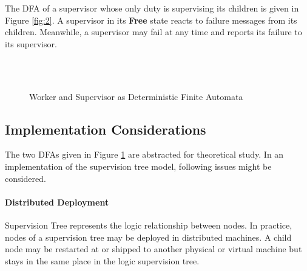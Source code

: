 \documentclass[12pt, authoryear]{article}
\begin{document}
The DFA of a supervisor whose only duty is supervising its children is given in
Figure \ref{fig:2}.  A supervisor in its {\bf Free} state reacts to failure 
messages from its children.  Meanwhile, a supervisor may fail at any time 
and reports its failure to its supervisor.

\begin{figure}[p]
     \centering 
        \\
        \\
  \caption{Worker and Supervisor as Deterministic Finite Automata}
  \label{fig:DFA}        
\end{figure}

\subsection{Implementation Considerations}

The two DFAs given in Figure \ref{fig:DFA} are abstracted for theoretical 
study.  In an implementation of the supervision tree model, following issues 
might be considered.

\paragraph{Distributed Deployment}
Supervision Tree represents the logic relationship between nodes.  In 
practice, nodes of a supervision tree may be deployed in distributed machines.  
A child node may be restarted at or shipped to another physical or virtual 
machine but stays in the same place in the logic supervision tree.
\end{document}
